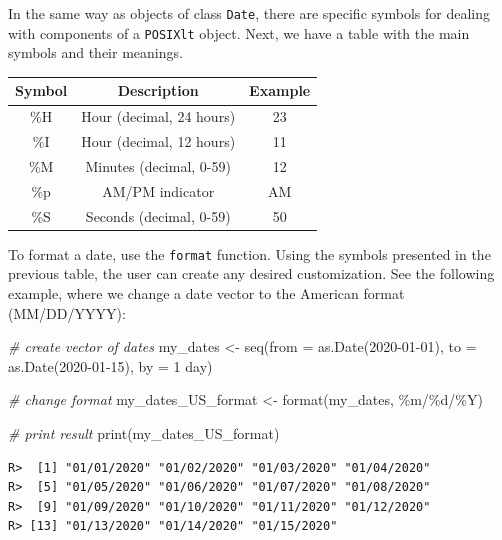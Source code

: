 \documentclass[
  12pt,
]{book}
\newenvironment{Shaded}{\begin{snugshade}}{\end{snugshade}}
\newcommand{\AttributeTok}[1]{\textcolor[rgb]{0.61,0.61,0.61}{#1}}
\newcommand{\CommentTok}[1]{\textcolor[rgb]{0.37,0.37,0.37}{\textit{#1}}}
\newcommand{\FunctionTok}[1]{\textcolor[rgb]{0,0,0}{#1}}
\newcommand{\NormalTok}[1]{#1}
\newcommand{\OtherTok}[1]{\textcolor[rgb]{0.37,0.37,0.37}{#1}}
\newcommand{\StringTok}[1]{\textcolor[rgb]{0.5,0.5,0.5}{#1}}
\begin{document}
In the same way as objects of class \texttt{Date}, there are specific symbols for dealing with components of a \texttt{POSIXlt} object. Next, we have a table with the main symbols and their meanings.

\begin{longtable}[]{@{}ccc@{}}
\toprule()
Symbol & Description & Example \\
\midrule()
\endhead
\%H & Hour (decimal, 24 hours) & 23 \\
\%I & Hour (decimal, 12 hours) & 11 \\
\%M & Minutes (decimal, 0-59) & 12 \\
\%p & AM/PM indicator & AM \\
\%S & Seconds (decimal, 0-59) & 50 \\
\bottomrule()
\end{longtable}

To format a date, use the \texttt{format} function. Using the symbols presented in the previous table, the user can create any desired customization. See the following example, where we change a date vector to the American format (MM/DD/YYYY): 

\begin{Shaded}
\begin{Highlighting}[]
\CommentTok{\# create vector of dates}
\NormalTok{my\_dates }\OtherTok{\textless{}{-}} \FunctionTok{seq}\NormalTok{(}\AttributeTok{from =} \FunctionTok{as.Date}\NormalTok{(}\StringTok{\textquotesingle{}2020{-}01{-}01\textquotesingle{}}\NormalTok{),}
                \AttributeTok{to =} \FunctionTok{as.Date}\NormalTok{(}\StringTok{\textquotesingle{}2020{-}01{-}15\textquotesingle{}}\NormalTok{),}
                \AttributeTok{by =} \StringTok{\textquotesingle{}1 day\textquotesingle{}}\NormalTok{)}

\CommentTok{\# change format}
\NormalTok{my\_dates\_US\_format }\OtherTok{\textless{}{-}} \FunctionTok{format}\NormalTok{(my\_dates, }\StringTok{\textquotesingle{}\%m/\%d/\%Y\textquotesingle{}}\NormalTok{)}

\CommentTok{\# print result}
\FunctionTok{print}\NormalTok{(my\_dates\_US\_format)}
\end{Highlighting}
\end{Shaded}

\begin{verbatim}
R>  [1] "01/01/2020" "01/02/2020" "01/03/2020" "01/04/2020"
R>  [5] "01/05/2020" "01/06/2020" "01/07/2020" "01/08/2020"
R>  [9] "01/09/2020" "01/10/2020" "01/11/2020" "01/12/2020"
R> [13] "01/13/2020" "01/14/2020" "01/15/2020"
\end{verbatim}
\end{document}
